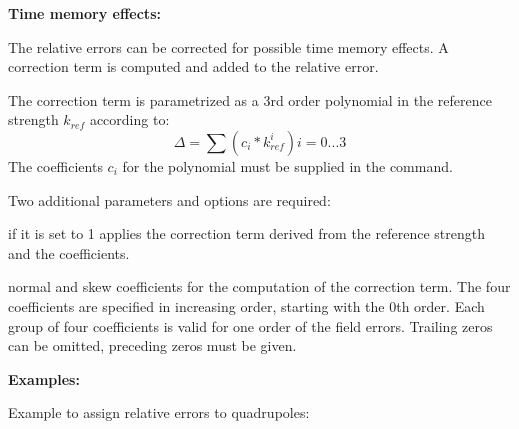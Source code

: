 \textbf{Time memory effects:}

The relative errors can be corrected for possible time memory effects. A
correction term is computed and added to the relative error. 

The correction term is parametrized as a 3rd order polynomial in the
reference strength $k_{ref}$ according to:  
\[ \Delta = \sum (c_i * {\mathit k}^{i}_{ref})            i = 0...3\]
The coefficients $c_i$ for the polynomial must be supplied in the
command.  

Two additional parameters and options are required: 
\begin{madlist}
   if it is set to 1 applies the correction term derived from the
  reference strength and the coefficients.  

   normal and skew coefficients for the computation
  of the correction term. The four coefficients are specified in increasing
  order, starting with the 0th order. Each group of four coefficients is
  valid for one order of the field errors. Trailing zeros can be omitted,
  preceding zeros must be given.  
\end{madlist}

\textbf{Examples:}

Example to assign relative errors to quadrupoles: 


